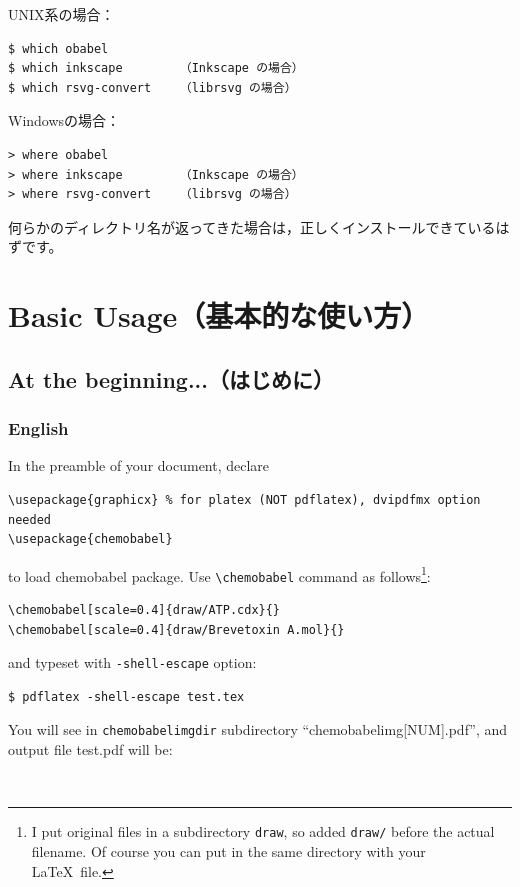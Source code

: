 \documentclass[12pt]{ltjsarticle}
\begin{document}
UNIX系の場合：
\begin{verbatim}
$ which obabel
$ which inkscape        （Inkscape の場合）
$ which rsvg-convert    （librsvg の場合）
\end{verbatim}

Windowsの場合：
\begin{verbatim}
> where obabel
> where inkscape        （Inkscape の場合）
> where rsvg-convert    （librsvg の場合）
\end{verbatim}

何らかのディレクトリ名が返ってきた場合は，正しくインストールできているはずです。

\clearpage

\section{Basic Usage（基本的な使い方）} \label{basic}

\subsection{At the beginning...（はじめに）}

\subsubsection{English}
In the preamble of your document, declare
\begin{verbatim}
\usepackage{graphicx} % for platex (NOT pdflatex), dvipdfmx option needed
\usepackage{chemobabel}
\end{verbatim}
to load \textsf{chemobabel} package.
Use \verb|\chemobabel| command as follows\footnote{I put original files
in a subdirectory \texttt{draw}, so added \texttt{draw/} before the actual
filename. Of course you can put in the same directory with your \LaTeX\ file.}:
\begin{verbatim}
\chemobabel[scale=0.4]{draw/ATP.cdx}{}
\chemobabel[scale=0.4]{draw/Brevetoxin A.mol}{}
\end{verbatim}
and typeset with \verb|-shell-escape| option:
\begin{verbatim}
$ pdflatex -shell-escape test.tex
\end{verbatim}
You will see in \verb|chemobabelimgdir| subdirectory ``chemobabelimg[NUM].pdf'',
and output file test.pdf will be:
\begin{figure}[h]
  \centering
   \\
\end{figure}
\end{document}
